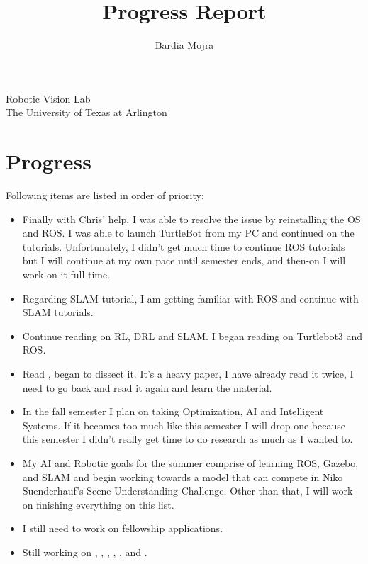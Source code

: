 \documentclass[11pt]{article}
\title{Progress Report}
\author{Bardia Mojra}
\begin{document}
	\maketitle
	\thispagestyle{empty}

\begin{center}
\bigskip
\bigskip
 Robotic Vision Lab \\
 The University of Texas at Arlington\\
\end{center}

\newpage 

\section{Progress}
Following items are listed in order of priority: 
\begin{itemize}  
	
  \item Finally with Chris' help, I was able to resolve the issue by reinstalling the OS and ROS. I was able to launch TurtleBot from my PC and continued on the tutorials. Unfortunately, I didn't get much time to continue ROS tutorials but I will continue at my own pace until semester ends, and then-on I will work on it full time. 
  
  \item Regarding SLAM tutorial, I am getting familiar with ROS and continue with SLAM tutorials.
  
  \item Continue reading on RL, DRL and SLAM. I began reading on Turtlebot3 and ROS.
  
  \item Read , began to dissect it. It's a heavy paper, I have already read it twice, I need to go back and read it again and learn the material. 
  
  \item In the fall semester I plan on taking Optimization, AI and Intelligent Systems. If it becomes too much like this semester I will drop one because this semester I didn't really get time to do research as much as I wanted to.
  
  \item My AI and Robotic goals for the summer comprise of learning ROS, Gazebo, and SLAM and begin working towards a model that can compete in Niko Suenderhauf's Scene Understanding Challenge. Other than that, I will work on finishing everything on this list. 
  
    
  \item I still need to work on fellowship applications.
    
  \item Still working on \cite{PanopticSeg2019}, \cite{SVO}, \cite{HornsMethod}, \cite{NYUV2}, \cite{DGCNNLPC}, and \cite{MaskRCNN}.

\end{itemize}
\end{document}
